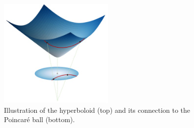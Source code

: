 \begin{figure}
  \centering
  \includegraphics[width=0.5\textwidth]{figs/hyperboloidToPoincare.jpg}

    
    
    
  \caption{Illustration of the hyperboloid (top) and its connection to the Poincaré ball (bottom)\cite{Chami2021representationLearningAlgorithmsHyperbolicSpaces}.}
  \label{fig:hyperboloidToPoincareBall}
\end{figure}